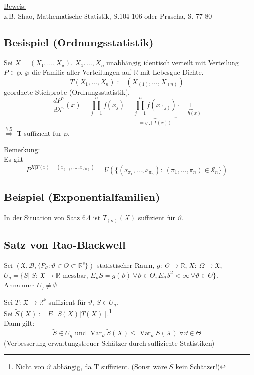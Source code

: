 \documentclass[a4paper,11pt,twoside,titlepage]{article}
\newcommand{\R}{{\mathbb R}}
\newcommand{\XX}{{\mathfrak X}} %
\newcommand\BB{ \mathcal{B} } %
\newcommand\SSS{ \mathcal{S} }
\DeclareMathOperator{\var}{Var}
\begin{document}
\underline{Beweis:}\\
z.B. Shao, Mathematische Statistik, S.104-106 oder Pruscha, S. 77-80

\subsection{Besispiel (Ordnungsstatistik)}
Sei $X=(X_1,\ldots,X_n)$, $X_1,\ldots,X_n$ unabhängig identisch verteilt mit Verteilung $P\in\wp$, $\wp$ die Familie aller Verteilungen auf $\R$ mit Lebesgue-Dichte.
\[T(X_1,\ldots,X_n):=(X_{(1)},\ldots,X_{(n)})\]
geordnete Stichprobe (Ordnungsstatistik).
\[\frac{dP^n}{d\lambda^n}(x)=\prod_{j=1}^n f(x_j)=\underbrace{\prod_{j=1}^n f(x_{(j)})}_{=g_P(T(x))}\cdot \underbrace{1}_{=h(x)}\]
$\stackrel{7.5}{\Rightarrow}$ T suffizient für $\wp$.

\underline{Bemerkung:}\\
Es gilt
\[P^{X|T(x)=(x_{(1)},\ldots,x_{(n)})}=U(\{(x_{\pi_1},\ldots,x_{\pi_n}):\ (\pi_1,\ldots,\pi_n)\in \SSS_n\})\]
\newpage
\subsection{Beispiel (Exponentialfamilien)}
In der Situation von Satz 6.4 ist $T_{(n)}(X)$ suffizient für $\vartheta$.\newline
[Aufgabe 21(b)]

\subsection{Satz von Rao-Blackwell} 
Sei $(\XX,\BB,\{P_\vartheta:\vartheta\in\Theta\subset\R^s\})$ statistischer Raum, $g:\ \Theta\to\R$, $X:\ \Omega\to\XX$, $U_g=\{S|\ S:\ \XX\to\R\mbox{ messbar, }E_\vartheta S=g(\vartheta)\ \forall\vartheta\in\Theta, E_\vartheta S^2<\infty\ \forall\vartheta\in\Theta\}$.\\
\underline{Annahme:} $U_g\neq\emptyset$

Sei $T:\ \XX\to\R^k$ suffizient für $\vartheta$, $S\in U_g$.\\
Sei $\tilde S(X):=E[S(X)|T(X)]$.\footnote{Nicht von $\vartheta$ abhängig, da T suffizient. (Sonst wäre $\tilde S$ kein Schätzer!)}\\
Dann gilt:
\[\tilde S\in U_g\mbox{ und }\var_\vartheta \tilde S(X)\leq\var_\vartheta S(X)\ \forall\vartheta\in\Theta\]
(Verbesserung erwartungstreuer Schätzer durch suffiziente Statistiken)
\end{document}

